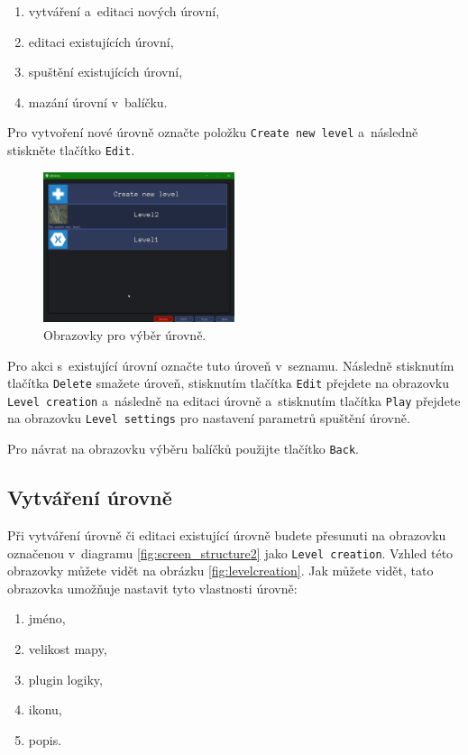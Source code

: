 \begin{enumerate}
	\item vytváření a~editaci nových úrovní,
	\item editaci existujících úrovní,
	\item spuštění existujících úrovní,
	\item mazání úrovní v~balíčku.
\end{enumerate}

Pro vytvoření nové úrovně označte položku \texttt{Create new level} a~následně stiskněte tlačítko \texttt{Edit}.

\begin{figure}[h]
	\centering
	\includegraphics[width=0.5\textwidth]{img/LevelPickingScreen.png}
	\caption{Obrazovky pro výběr úrovně.}
	\label{fig:levelpicking}
\end{figure}

Pro akci s~existující úrovní označte tuto úroveň v~seznamu. Následně stisknutím tlačítka \texttt{Delete} smažete úroveň, stisknutím tlačítka \texttt{Edit} přejdete na obrazovku \texttt{Level creation} a~následně na editaci úrovně a~stisknutím tlačítka \texttt{Play} přejdete na obrazovku \texttt{Level settings} pro nastavení parametrů spuštění úrovně.

Pro návrat na obrazovku výběru balíčků použijte tlačítko \texttt{Back}.
\subsection{Vytváření úrovně}
Při vytváření úrovně či editaci existující úrovně budete přesunuti na obrazovku označenou v~diagramu \ref{fig:screen_structure2} jako \texttt{Level creation}. Vzhled této obrazovky můžete vidět na obrázku \ref{fig:levelcreation}. Jak můžete vidět, tato obrazovka umožňuje nastavit tyto vlastnosti úrovně:

\begin{enumerate}
	\item jméno,
	\item velikost mapy,
	\item plugin logiky,
	\item ikonu,
	\item popis.
\end{enumerate}


